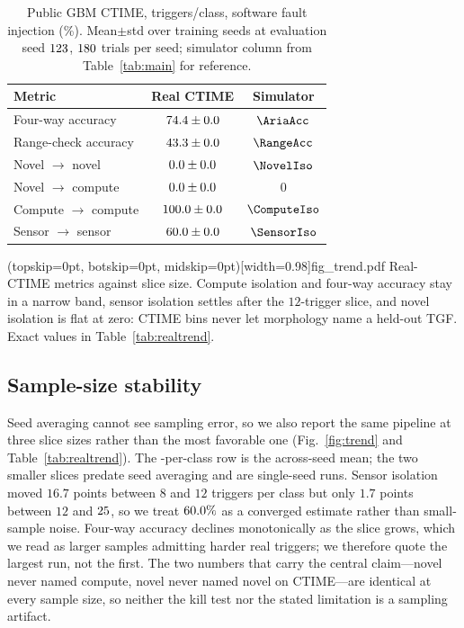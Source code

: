 \documentclass{ieeeaccess}
\begin{document}
\begin{table}[!t]
\caption{Public GBM CTIME, \RealPerClass{} triggers/class, software fault injection (\%). Mean$\pm$std over \RealSeeds{} training seeds at evaluation seed $123$, $180{}$ trials per seed; simulator column from Table~\ref{tab:main} for reference.}
\label{tab:real}
\centering
\begin{tabular}{lcc}
\toprule
Metric & Real CTIME & Simulator \\
\midrule
Four-way accuracy & $74.4\pm0.0$ & $\AriaAcc$ \\
Range-check accuracy & $43.3\pm0.0$ & $\RangeAcc$ \\
Novel $\to$ novel & $0.0\pm0.0$ & $\NovelIso$ \\
Novel $\to$ compute & $0.0\pm0.0$ & $0$ \\
Compute $\to$ compute & $100.0\pm0.0$ & $\ComputeIso$ \\
Sensor $\to$ sensor & $60.0\pm0.0$ & $\SensorIso$ \\
\bottomrule
\end{tabular}
\end{table}

\Figure[!t](topskip=0pt, botskip=0pt, midskip=0pt)[width=0.98\columnwidth]{fig_trend.pdf}
{Real-CTIME metrics against slice size. Compute isolation and four-way accuracy stay in a narrow band, sensor isolation settles after the $12$-trigger slice, and novel isolation is flat at zero: CTIME bins never let morphology name a held-out TGF. Exact values in Table~\ref{tab:realtrend}.\label{fig:trend}}

\subsection{Sample-size stability}
Seed averaging cannot see sampling error, so we also report the same pipeline at three slice sizes rather than the most favorable one (Fig.~\ref{fig:trend} and Table~\ref{tab:realtrend}). The \RealPerClass{}-per-class row is the across-seed mean; the two smaller slices predate seed averaging and are single-seed runs. Sensor isolation moved $16.7$ points between $8$ and $12$ triggers per class but only $1.7$ points between $12$ and $25{}$, so we treat $60.0\%$ as a converged estimate rather than small-sample noise. Four-way accuracy declines monotonically as the slice grows, which we read as larger samples admitting harder real triggers; we therefore quote the largest run, not the first. The two numbers that carry the central claim---novel never named compute, novel never named novel on CTIME---are identical at every sample size, so neither the kill test nor the stated limitation is a sampling artifact.
\end{document}
